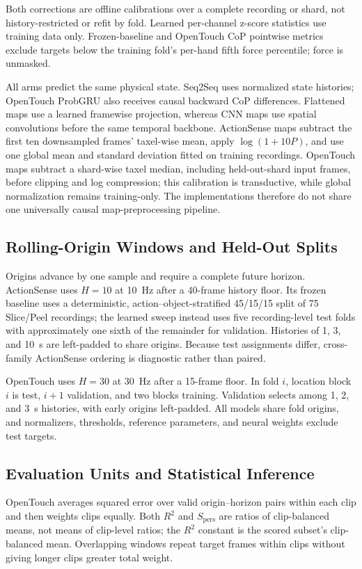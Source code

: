 \documentclass[letterpaper, 10 pt, conference]{ieeeconf}
\newcommand{\Rtwo}{R^{2}}
\begin{document}
Both corrections are offline calibrations over a complete recording or shard, not history-restricted or refit by fold. Learned per-channel z-score statistics use training data only. Frozen-baseline and OpenTouch CoP pointwise metrics exclude targets below the training fold's per-hand fifth force percentile; force is unmasked.

All arms predict the same physical state. Seq2Seq uses normalized state histories; OpenTouch ProbGRU also receives causal backward CoP differences. Flattened maps use a learned framewise projection, whereas CNN maps use spatial convolutions before the same temporal backbone. ActionSense maps subtract the first ten downsampled frames' taxel-wise mean, apply $\log(1+10P)$, and use one global mean and standard deviation fitted on training recordings. OpenTouch maps subtract a shard-wise taxel median, including held-out-shard input frames, before clipping and log compression; this calibration is transductive, while global normalization remains training-only. The implementations therefore do not share one universally causal map-preprocessing pipeline.

\subsection{Rolling-Origin Windows and Held-Out Splits}
Origins advance by one sample and require a complete future horizon. ActionSense uses $H=10$ at 10~Hz after a 40-frame history floor. Its frozen baseline uses a deterministic, action--object-stratified 45/15/15 split of 75 Slice/Peel recordings; the learned sweep instead uses five recording-level test folds with approximately one sixth of the remainder for validation. Histories of 1, 3, and 10~s are left-padded to share origins. Because test assignments differ, cross-family ActionSense ordering is diagnostic rather than paired.

OpenTouch uses $H=30$ at 30~Hz after a 15-frame floor. In fold $i$, location block $i$ is test, $i+1$ validation, and two blocks training. Validation selects among 1, 2, and 3~s histories, with early origins left-padded. All models share fold origins, and normalizers, thresholds, reference parameters, and neural weights exclude test targets.

\subsection{Evaluation Units and Statistical Inference}
OpenTouch averages squared error over valid origin--horizon pairs within each clip and then weights clips equally. Both $\Rtwo$ and $S_{\mathrm{pers}}$ are ratios of clip-balanced means, not means of clip-level ratios; the $\Rtwo$ constant is the scored subset's clip-balanced mean. Overlapping windows repeat target frames within clips without giving longer clips greater total weight.
\end{document}
